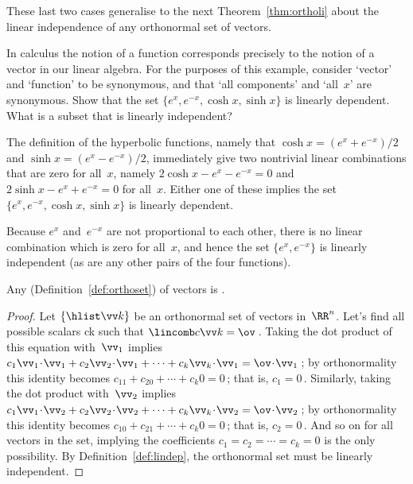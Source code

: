 \begin{example}
\begin{enumerate}
\end{enumerate}
These last two cases generalise to the next Theorem~\ref{thm:ortholi} about the linear independence of any orthonormal set of vectors.
\end{example}



\begin{example} \label{eg:}
In calculus the notion of a function corresponds precisely to the notion of a vector in our linear algebra.  
For the purposes of this example, consider `vector' and `function' to be synonymous, and that `all components' and `all~\(x\)' are synonymous. 
Show that the set \(\{e^x,e^{-x},\cosh x,\sinh x\}\) is linearly dependent.  
What is a subset that is linearly independent?
\begin{solution} 
The definition of the hyperbolic functions, namely that \(\cosh x=(e^x+e^{-x})/2\) and \(\sinh x=(e^x-e^{-x})/2\), immediately give two nontrivial linear combinations that are zero for all~\(x\), namely \(2\cosh x-e^x-e^{-x}=0\) and \(2\sinh x-e^x+e^{-x}=0\) for all~\(x\).
Either one of these implies the set \(\{e^x,e^{-x},\cosh x,\sinh x\}\) is linearly dependent.

Because \(e^x\) and~\(e^{-x}\) are not proportional to each other, there is no linear combination which is zero for all~\(x\), and hence the set \(\{e^x,e^{-x}\}\) is linearly independent (as are any other pairs of the four functions).
\end{solution}
\end{example}






\begin{theorem} \label{thm:ortholi}
Any  (Definition~\ref{def:orthoset}) of vectors is .
\end{theorem}
\begin{proof} %
Let \(\{\hlist\vv k\}\) be an orthonormal set of vectors in~\(\RR^n\).
Let's find all possible scalars \hlist ck such that \(\lincomb c\vv k=\ov\)\,.
Taking the dot product of this equation with~\(\vv_1\) implies
\(c_1\vv_1\cdot\vv_1+c_2\vv_2\cdot\vv_1+\cdots+c_k\vv_k\cdot\vv_1=\ov\cdot\vv_1\)\,;
by orthonormality this identity becomes
\(c_11+c_20+\cdots+c_k0=0\)\,; that is, \(c_1=0\)\,.
Similarly, taking the dot product with~\(\vv_2\) implies
\(c_1\vv_1\cdot\vv_2+c_2\vv_2\cdot\vv_2+\cdots+c_k\vv_k\cdot\vv_2=\ov\cdot\vv_2\)\,;
by orthonormality this identity becomes
\(c_10+c_21+\cdots+c_k0=0\)\,; that is, \(c_2=0\)\,.
And so on for all vectors in the set, implying the coefficients \(c_1=c_2=\cdots=c_k=0\) is the only possibility.
By Definition~\ref{def:lindep}, the orthonormal set must be linearly independent.
\end{proof}


